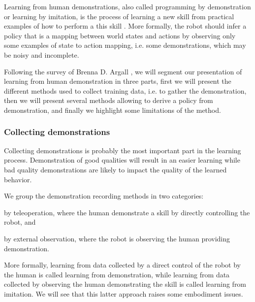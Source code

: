 Learning from human demonstrations, also called programming by demonstration or learning by imitation, is the process of learning a new skill from practical examples of how to perform a this skill \cite{schaal1999imitation,calinon2008robot,argall09survey,lopes10imitationchapter}. More formally, the robot should infer a policy that is a mapping between world states and actions by observing only some examples of state to action mapping, i.e. some demonstrations, which may be noisy and incomplete.

Following the survey of Brenna D. Argall \cite{argall09survey}, we will segment our presentation of learning from human demonstration in three parts, first we will present the different methods used to collect training data, i.e. to gather the demonstration, then we will present several methods allowing to derive a policy from demonstration, and finally we highlight some limitations of the method.


\subsubsection*{Collecting demonstrations}

Collecting demonstrations is probably the most important part in the learning process. Demonstration of good qualities will result in an easier learning while bad quality demonstrations are likely to impact the quality of the learned behavior.

We group the demonstration recording methods in two categories: \begin{inparaenum} \item by teleoperation, where the human demonstrate a skill by directly controlling the robot, and \item by external observation, where the robot is observing the human providing demonstration. \end{inparaenum} More formally, learning from data collected by a direct control of the robot by the human is called learning from demonstration, while learning from data collected by observing the human demonstrating the skill is called learning from imitation. We will see that this latter approach raises some embodiment issues.

